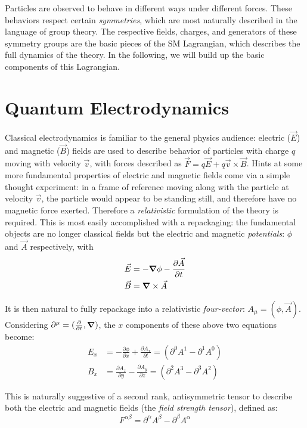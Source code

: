 Particles are observed to behave in different ways under different forces. These behaviors respect certain \emph{symmetries}, which are most naturally described in the language of group theory. The respective fields, charges, and 
generators of these symmetry groups are the basic pieces of the SM Lagrangian, which describes the full dynamics of the theory. In the following, we will build up the basic components of this Lagrangian.

\section{Quantum Electrodynamics}
Classical electrodynamics is familiar to the general physics audience: electric ($\vec{E}$) and magnetic ($\vec{B}$) 
fields are used to describe behavior of particles with charge $q$ moving with velocity $\vec{v}$, with 
forces described as $\vec{F} =q\vec{E} + q \vec{v} \times \vec{B}$. Hints at some more fundamental properties of
electric and magnetic fields come via a simple thought experiment: in a frame of reference moving along with 
the particle at velocity $\vec{v}$, the particle would appear to be standing still, and therefore have no 
magnetic force exerted. Therefore a \emph{relativistic} formulation of the theory is required. This is most 
easily accomplished with a repackaging: the fundamental objects are no longer classical fields but the electric 
and magnetic \emph{potentials}: $\phi$ and $\vec{A}$ respectively, with
\begin{align}
\vec{E} &= -\grad\phi - \frac{\partial \vec{A}}{\partial t}\\
\vec{B} &= \grad \times \vec{A}
\end{align}

It is then natural to fully repackage into a relativistic \emph{four-vector}: $A_{\mu} = (\phi, \vec{A})$. 
Considering $\partial^{\mu} = (\frac{\partial}{\partial t}, \grad)$, the $x$ components of these above 
two equations become:
\begin{align}
E_{x} &= -\frac{\partial \phi}{\partial x} + \frac{\partial A_{x}}{\partial t} = ( \partial^0 A^1 - \partial^1 A^0)\\
B_{x} &= \frac{\partial A_{z}}{\partial y} - \frac{\partial A_{y}}{\partial z} = (\partial^2 A^3 - \partial^3 A^2)
\end{align}

This is naturally suggestive of a second rank, antisymmetric tensor to describe both the electric and magnetic 
fields (the \emph{field strength tensor}), defined as:
\begin{equation}
F^{\alpha\beta} = \partial^{\alpha}A^{\beta} - \partial^{\beta} A^{\alpha}
\end{equation}

